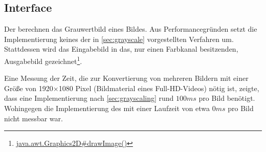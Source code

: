 \subsection{Interface }
Der  berechnen das Grauwertbild eines Bildes.
Aus Performancegründen setzt die Implementierung  keines der in \autoref{sec:grayscale} vorgestellten Verfahren um.
Stattdessen wird das Eingabebild in das, nur einen Farbkanal besitzenden, Ausgabebild gezeichnet\footnote{\href{http://docs.oracle.com/javase/6/docs/api/java/awt/Graphics2D.html\#drawImage(java.awt.image.BufferedImage, java.awt.image.BufferedImageOp, int, int)}{java.awt.Graphics2D\#drawImage()}}.

Eine Messung der Zeit, die zur Konvertierung von mehreren Bildern mit einer Größe von 1920$\times$1080 Pixel (Bildmaterial eines Full-HD-Videos) nötig ist, zeigte, dass eine Implementierung nach \autoref{sec:grayscaling} rund $100\unit{ms}$ pro Bild benötigt.
Wohingegen die Implementierung des  mit einer Laufzeit von etwa $0\unit{ms}$ pro Bild nicht messbar war.

